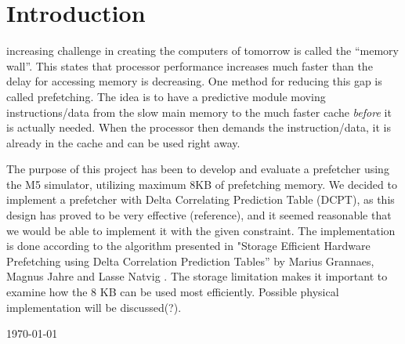 \section{Introduction}

 increasing challenge in creating the computers of tomorrow
is called the ``memory wall''. This states that processor performance increases
much faster than the delay for accessing memory is decreasing. One method for
reducing this gap is called prefetching. The idea is to have a predictive module
moving  instructions/data from the slow main memory to the much faster cache
\emph{before} it is actually needed. When the processor then demands the
instruction/data, it is already in the cache and can be used right away.


The purpose of this project has been to develop and evaluate a prefetcher using
the M5 simulator, utilizing maximum 8KB of prefetching memory. We decided to
implement a prefetcher with Delta Correlating Prediction Table (DCPT), as this
design has proved to be very effective (reference), and it seemed reasonable
that we would be able to implement it with the given constraint. The
implementation is done according to the algorithm presented in "Storage
Efficient Hardware Prefetching using Delta Correlation Prediction Tables” by
Marius Grannaes, Magnus Jahre and Lasse Natvig \cite{dcpt}. The storage limitation makes it
important to examine how the 8 KB can be used most efficiently. Possible
physical implementation will be discussed(?).


\hfill \today


